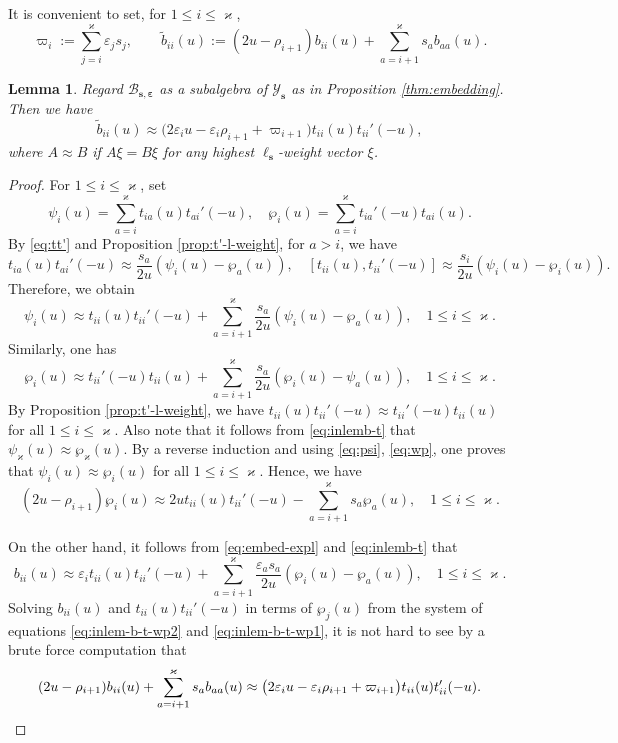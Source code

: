 \documentclass[11pt,reqno]{amsart}
\numberwithin{equation}{section}
\newtheorem{lem}[thm]{Lemma}
\theoremstyle{definition}
\theoremstyle{remark}
\newcommand{\beq}{\begin{equation}}
\newcommand{\eeq}{\end{equation}}
\newcommand{\tl}{\tilde}
\newcommand{\lle}{\leqslant}
\newcommand{\YMN}{{\mathscr{Y}_{\bm s}}}
\newcommand{\BMN}{{\mathscr{B}_{\bm s,\bm \ve}}}
\newcommand{\ka}{\varkappa}
\newcommand{\ve}{\varepsilon}
\newcommand{\s}{{\bm s}}
\begin{document}
It is convenient to set, for $1\lle i\lle \ka$,
\beq\label{eq:def-tl-b}
\varpi_{i} :=\sum_{j=i}^{\ka}\ve_js_j,\qquad 
\tl b_{ii}(u) :=(2u-\rho_{i+1})b_{ii}(u)+\sum_{a=i+1}^\ka s_ab_{aa}(u).
\eeq
\begin{lem}\label{lem:b-in-t}
Regard $\BMN$ as a subalgebra of $\YMN$ as in Proposition \ref{thm:embedding}. Then we have
\beq
\tl b_{ii}(u)\approx \big(2\ve_i u-\ve_i\rho_{i+1}+\varpi_{i+1}\big)t_{ii}(u)t_{ii}'(-u),
\eeq
where $A \approx B$ if $A\xi =B\xi$ for any highest $\ell_\s$-weight vector $\xi$.
\end{lem}
\begin{proof}
For $1\lle i\lle \ka$, set
\[
\psi_i(u)=\sum_{a=i}^\ka t_{ia}(u)t_{ai}'(-u),\quad \wp_i(u)=\sum_{a=i}^\ka t_{ia}'(-u)t_{ai}(u).
\]
By \eqref{eq:tt'} and Proposition \ref{prop:t'-l-weight}, for $a>i$, we have
\beq\label{eq:inlemb-t}
t_{ia}(u)t_{ai}'(-u)\approx \frac{s_a}{2u}(\psi_i(u)-\wp_a(u)),\quad [t_{ii}(u),t_{ii}'(-u)]\approx\frac{s_i}{2u}(\psi_i(u)-\wp_i(u)).
\eeq
Therefore, we obtain
\beq\label{eq:psi}
\psi_i(u)\approx t_{ii}(u)t_{ii}'(-u)+\sum_{a=i+1}^\ka \frac{s_a}{2u}(\psi_i(u)-\wp_a(u)),\quad 1\lle i\lle \ka.
\eeq
Similarly, one has
\beq\label{eq:wp}
\wp_i(u)\approx t_{ii}'(-u)t_{ii}(u)+\sum_{a=i+1}^\ka\frac{s_a}{2u}(\wp_i(u)-\psi_a(u)),\quad 1\lle i\lle \ka.
\eeq
By Proposition \ref{prop:t'-l-weight}, we have $t_{ii}(u)t_{ii}'(-u)\approx t_{ii}'(-u)t_{ii}(u)$ for all $1\lle i\lle \ka$. Also note that it follows from \eqref{eq:inlemb-t} that $\psi_\ka(u)\approx \wp_\ka(u)$. By a reverse induction and using \eqref{eq:psi}, \eqref{eq:wp}, one proves that $\psi_i(u)\approx \wp_i(u)$ for all $1\lle i\lle \ka$. Hence, we have
\beq\label{eq:inlem-b-t-wp2}
(2u-\rho_{i+1})\wp_i(u)\approx 2ut_{ii}(u)t_{ii}'(-u)-\sum_{a=i+1}^\ka s_a \wp_a(u),\quad 1\lle i\lle \ka.
\eeq

On the other hand, it follows from \eqref{eq:embed-expl} and \eqref{eq:inlemb-t} that
\beq\label{eq:inlem-b-t-wp1}
b_{ii}(u)\approx \ve_i t_{ii}(u)t_{ii}'(-u) +\sum_{a=i+1}^\ka \frac{\ve_as_a}{2u}(\wp_i(u)-\wp_a(u)),\quad 1\lle i\lle \ka.
\eeq
Solving $b_{ii}(u)$ and $t_{ii}(u)t_{ii}'(-u)$ in terms of $\wp_{j}(u)$ from the system of equations \eqref{eq:inlem-b-t-wp2} and \eqref{eq:inlem-b-t-wp1}, it is not hard  to see by a brute force computation that
\[
(2u-\rho_{i+1})b_{ii}(u)+\sum_{a=i+1}^\ka s_ab_{aa}(u)\approx \big(2\ve_i u-\ve_i\rho_{i+1}+\varpi_{i+1}\big)t_{ii}(u)t_{ii}'(-u).\qedhere
\]
\end{proof}
\end{document}
